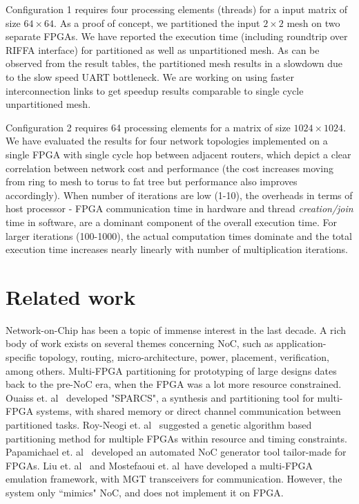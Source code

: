 \documentclass[conference, 9pt]{IEEEtran}
\begin{document}
Configuration 1 requires four processing elements (threads) for a input matrix of size $64 \times 64$. As a proof of concept, we partitioned the input $2 \times 2$ mesh on two separate FPGAs. We have reported the execution time (including roundtrip over RIFFA interface) for partitioned as well as unpartitioned mesh. As can be observed from the result tables, the partitioned mesh results in a slowdown due to the slow speed UART bottleneck. We are working on using faster interconnection links to get speedup results comparable to single cycle unpartitioned mesh.

Configuration 2 requires 64 processing elements for a matrix of size $1024 \times 1024$. We have evaluated the results for four network topologies implemented on a single FPGA with single cycle hop between adjacent routers, which depict a clear correlation between network cost and performance (the cost increases moving from ring to mesh to torus to fat tree but performance also improves accordingly). When number of iterations are low (1-10), the overheads in terms of host processor - FPGA communication time in hardware and thread \emph{creation/join} time in software, are a dominant component of the overall execution time. For larger iterations (100-1000), the actual computation times dominate and the total execution time increases nearly linearly with number of multiplication iterations.



\section{Related work}
\label{sec:relwork}

Network-on-Chip has been a topic of immense interest in the last decade. A rich 
body of work exists on several themes concerning NoC, such as application-specific topology, 
routing, micro-architecture, power, placement, verification, among others. 
Multi-FPGA partitioning for prototyping of large designs dates back to the 
pre-NoC era, when the FPGA was a lot more resource constrained. Ouaiss et. 
al~\cite{ouaiss1998integrated} developed "SPARCS", a synthesis and partitioning 
tool for multi-FPGA systems, with shared memory or direct channel communication 
between partitioned tasks. Roy-Neogi et. al~\cite{roy1995multiple} suggested a 
genetic algorithm based partitioning method for multiple FPGAs within resource 
and timing constraints. Papamichael et. al~\cite{papamichael2012connect} 
developed an automated NoC generator tool tailor-made for FPGAs. Liu et. 
al~\cite{liu2010building} and Mostefaoui et. al~\cite{4669212}have developed a multi-FPGA emulation framework, with 
MGT transceivers for communication. However, the system only ``mimics" NoC, and 
does not implement it on FPGA.
\end{document}
